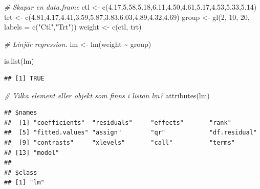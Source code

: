 \documentclass[
]{book}
\newenvironment{Shaded}{\begin{snugshade}}{\end{snugshade}}
\newcommand{\AttributeTok}[1]{\textcolor[rgb]{0.77,0.63,0.00}{#1}}
\newcommand{\CommentTok}[1]{\textcolor[rgb]{0.56,0.35,0.01}{\textit{#1}}}
\newcommand{\DecValTok}[1]{\textcolor[rgb]{0.00,0.00,0.81}{#1}}
\newcommand{\FloatTok}[1]{\textcolor[rgb]{0.00,0.00,0.81}{#1}}
\newcommand{\FunctionTok}[1]{\textcolor[rgb]{0.00,0.00,0.00}{#1}}
\newcommand{\NormalTok}[1]{#1}
\newcommand{\OtherTok}[1]{\textcolor[rgb]{0.56,0.35,0.01}{#1}}
\newcommand{\SpecialCharTok}[1]{\textcolor[rgb]{0.00,0.00,0.00}{#1}}
\newcommand{\StringTok}[1]{\textcolor[rgb]{0.31,0.60,0.02}{#1}}
\begin{document}
\begin{Shaded}
\begin{Highlighting}[]
\CommentTok{\# Skapar en data.frame}
\NormalTok{ctl }\OtherTok{\textless{}{-}} \FunctionTok{c}\NormalTok{(}\FloatTok{4.17}\NormalTok{,}\FloatTok{5.58}\NormalTok{,}\FloatTok{5.18}\NormalTok{,}\FloatTok{6.11}\NormalTok{,}\FloatTok{4.50}\NormalTok{,}\FloatTok{4.61}\NormalTok{,}\FloatTok{5.17}\NormalTok{,}\FloatTok{4.53}\NormalTok{,}\FloatTok{5.33}\NormalTok{,}\FloatTok{5.14}\NormalTok{)}
\NormalTok{trt }\OtherTok{\textless{}{-}} \FunctionTok{c}\NormalTok{(}\FloatTok{4.81}\NormalTok{,}\FloatTok{4.17}\NormalTok{,}\FloatTok{4.41}\NormalTok{,}\FloatTok{3.59}\NormalTok{,}\FloatTok{5.87}\NormalTok{,}\FloatTok{3.83}\NormalTok{,}\FloatTok{6.03}\NormalTok{,}\FloatTok{4.89}\NormalTok{,}\FloatTok{4.32}\NormalTok{,}\FloatTok{4.69}\NormalTok{)}
\NormalTok{group }\OtherTok{\textless{}{-}} \FunctionTok{gl}\NormalTok{(}\DecValTok{2}\NormalTok{, }\DecValTok{10}\NormalTok{, }\DecValTok{20}\NormalTok{, }\AttributeTok{labels =} \FunctionTok{c}\NormalTok{(}\StringTok{"Ctl"}\NormalTok{,}\StringTok{"Trt"}\NormalTok{))}
\NormalTok{weight }\OtherTok{\textless{}{-}} \FunctionTok{c}\NormalTok{(ctl, trt)}

\CommentTok{\# Linjär regression.}
\NormalTok{lm }\OtherTok{\textless{}{-}} \FunctionTok{lm}\NormalTok{(weight }\SpecialCharTok{\textasciitilde{}}\NormalTok{ group)}

\FunctionTok{is.list}\NormalTok{(lm)}
\end{Highlighting}
\end{Shaded}

\begin{verbatim}
## [1] TRUE
\end{verbatim}

\begin{Shaded}
\begin{Highlighting}[]
\CommentTok{\# Vilka element eller objekt som finns i listan lm? }
\FunctionTok{attributes}\NormalTok{(lm)}
\end{Highlighting}
\end{Shaded}

\begin{verbatim}
## $names
##  [1] "coefficients"  "residuals"     "effects"       "rank"         
##  [5] "fitted.values" "assign"        "qr"            "df.residual"  
##  [9] "contrasts"     "xlevels"       "call"          "terms"        
## [13] "model"        
## 
## $class
## [1] "lm"
\end{verbatim}
\end{document}
